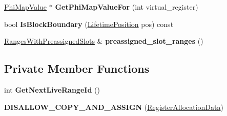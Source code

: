 \begin{DoxyCompactItemize}
\item 
\hyperlink{classv8_1_1internal_1_1compiler_1_1_register_allocation_data_1_1_phi_map_value}{Phi\+Map\+Value} $\ast$ {\bfseries Get\+Phi\+Map\+Value\+For} (int virtual\+\_\+register)\hypertarget{classv8_1_1internal_1_1compiler_1_1_register_allocation_data_a0d52d71a36565e0ff19921fe5fda463d}{}\label{classv8_1_1internal_1_1compiler_1_1_register_allocation_data_a0d52d71a36565e0ff19921fe5fda463d}

\item 
bool {\bfseries Is\+Block\+Boundary} (\hyperlink{classv8_1_1internal_1_1compiler_1_1_lifetime_position}{Lifetime\+Position} pos) const \hypertarget{classv8_1_1internal_1_1compiler_1_1_register_allocation_data_a8bf6f4cfdd098af894f3b10c7ac65a0b}{}\label{classv8_1_1internal_1_1compiler_1_1_register_allocation_data_a8bf6f4cfdd098af894f3b10c7ac65a0b}

\item 
\hyperlink{classv8_1_1internal_1_1_zone_vector}{Ranges\+With\+Preassigned\+Slots} \& {\bfseries preassigned\+\_\+slot\+\_\+ranges} ()\hypertarget{classv8_1_1internal_1_1compiler_1_1_register_allocation_data_ae5e91e376daf933766242d3cb7441581}{}\label{classv8_1_1internal_1_1compiler_1_1_register_allocation_data_ae5e91e376daf933766242d3cb7441581}

\end{DoxyCompactItemize}
\subsection*{Private Member Functions}
\begin{DoxyCompactItemize}
\item 
int {\bfseries Get\+Next\+Live\+Range\+Id} ()\hypertarget{classv8_1_1internal_1_1compiler_1_1_register_allocation_data_a8e90c3c2732eb37892a437322c630eb2}{}\label{classv8_1_1internal_1_1compiler_1_1_register_allocation_data_a8e90c3c2732eb37892a437322c630eb2}

\item 
{\bfseries D\+I\+S\+A\+L\+L\+O\+W\+\_\+\+C\+O\+P\+Y\+\_\+\+A\+N\+D\+\_\+\+A\+S\+S\+I\+GN} (\hyperlink{classv8_1_1internal_1_1compiler_1_1_register_allocation_data}{Register\+Allocation\+Data})\hypertarget{classv8_1_1internal_1_1compiler_1_1_register_allocation_data_aa697c0239d6535365e51779daa8fdef9}{}\label{classv8_1_1internal_1_1compiler_1_1_register_allocation_data_aa697c0239d6535365e51779daa8fdef9}

\end{DoxyCompactItemize}
